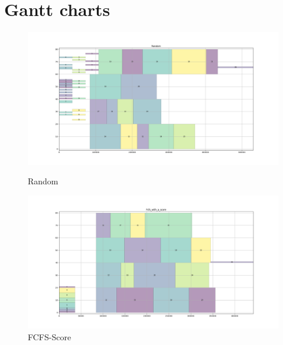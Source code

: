 \documentclass[a4paper]{article}
\begin{document}
\section{Gantt charts}
\begin{figure}[H] 
  \begin{minipage}[b]{0.5\linewidth}
    \centering
    \includegraphics[width=1.11\linewidth]{MBSS/plot/Gantt_charts/Random_LeftShift.png} 
    \caption{Random} 
    \vspace{4ex}
  \end{minipage}%
  \begin{minipage}[b]{0.5\linewidth}
    \centering
    \includegraphics[width=1.11\linewidth]{MBSS/plot/Gantt_charts/FCFS-Score_LeftShift.png} 
    \caption{FCFS-Score} 
    \vspace{4ex}
  \end{minipage}
  \begin{minipage}[b]{0.5\linewidth}
    \centering

\end{minipage}
\end{figure}
\end{document}
